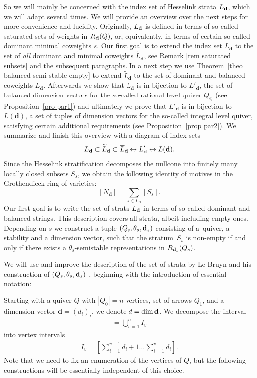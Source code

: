 \documentclass[pdftex]{sigma}
\numberwithin{equation}{section}
\theoremstyle{definition}
\begin{document}
So we will mainly be concerned with the index set of Hesselink strata $L_{\bf d}$, which we will adapt several times. We will provide an overview over the next steps for more convenience and lucidity. Originally, $L_{\bf d}$ is defined in terms of so-called saturated sets of weights in $R_{\bf d}(Q)$, or, equivalently, in terms of certain so-called dominant minimal coweights $s$. Our first goal is to extend the index set $L_{\mathbf{d}}$ to the set of {\it all} dominant and minimal coweights $\widetilde{L}_{\mathbf{d}}$, see Remark \ref{rem saturated subsets} and the subsequent paragraphs. In a next step we use Theorem~\ref{theo balanced semi-stable empty} to extend $\widetilde{L}_{\mathbf{d}}$ to the set of dominant and balanced coweights $\overline{L}_{\mathbf{d}}$. Afterwards we show that $\overline{L}_{\mathbf{d}}$ is in bijection to $L'_{\mathbf{d}}$, the set of balanced dimension vectors for the so-called rational level quiver $Q_{\mathbb{Q}}$ (see Proposition~\ref{pro par1}) and ultimately we prove that $L'_{\mathbf{d}}$ is in bijection to $L(\mathbf{d})$, a set of tuples of dimension vectors for the so-called integral level quiver, satisfying certain additional requirements (see Proposition~\ref{prop par2}). We summarize and finish this overview with a diagram of index sets
\[L_{\bf d}\subset\widetilde{L}_{\bf d}\subset\overline{L}_{\bf d}\leftrightarrow L_{\bf d}'\leftrightarrow L({\bf d}).\]
Since the Hesselink stratification decomposes the nullcone into finitely many locally closed subsets $S_s$, we obtain the following identity of motives in the Grothendieck ring of varieties:
\begin{equation}\label{iom}
[N_{\mathbf{d}}] = \sum_{s \in L_{\mathbf{d}}} [S_s] .
\end{equation}
Our first goal is to write the set of strata $L_{\bf d}$ in terms of so-called dominant and balanced strings. This description covers all strata, albeit including empty ones. Depending on $s$ we construct a tuple $(Q_s, \theta_s, {\bf d}_s)$ consisting of a~quiver, a stability and a dimension vector, such that the stratum~$S_s$ is non-empty if and only if there exists a $\theta_s$-semistable representations in $R_{{\bf d}_s}(Q_s)$.

We will use and improve the description of the set of strata by Le Bruyn and his construction of $(Q_s, \theta_s, {\bf d}_s)$ \cite{LB}, beginning with the introduction of essential notation:

Starting with a quiver $Q$ with $|Q_0| = n$ vertices, set of arrows $Q_1$, and a dimension vector $\mathbf{d}=(d_i)_i$, we denote $d = \dim{\bf d}$. We decompose the interval
\begin{align*}
 [1 \dots d] = \bigcup_{v=1}^n I_v
\end{align*}
into vertex intervals
\begin{align*}
I_v = \left[ \sum_{i=1}^{v-1} d_i +1 \dots \sum_{i=1}^v d_i\right] .
\end{align*}
Note that we need to fix an enumeration of the vertices of $Q$, but the following constructions will be essentially independent of this choice.
\end{document}
